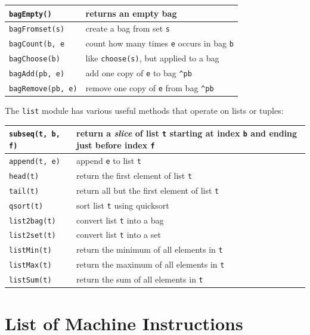 \documentclass{report}
\begin{document}
\vspace{1em}
\begin{tabular}{|l|l|}
\hline
\texttt{bagEmpty()} & returns an empty bag\\
\hline
\texttt{bagFromset(s)} & create a bag from set \texttt{s}\\
\hline
\texttt{bagCount(b, e} & count how many times \texttt{e} occurs in bag \texttt{b}\\
\hline
\texttt{bagChoose(b)} & like \texttt{choose(s)}, but applied to a bag\\
\hline
\texttt{bagAdd(pb, e)} & add one copy of \texttt{e} to bag \texttt{\^{}pb}\\
\hline
\texttt{bagRemove(pb, e)} & remove one copy of \texttt{e} from bag \texttt{\^{}pb}\\
\hline
\end{tabular}
\vspace{1em}

\noindent
{}
The \texttt{list} module has various useful methods that operate on lists
or tuples:

\vspace{1em}
\begin{tabular}{|l|l|}
\hline
\texttt{subseq(t, b, f)} & return a \emph{slice} of list \texttt{t} starting
at index \texttt{b} and ending just before index \texttt{f}\\
\hline
\texttt{append(t, e)} & append \texttt{e} to list \texttt{t}\\
\hline
\texttt{head(t)} & return the first element of list \texttt{t}\\
\hline
\texttt{tail(t)} & return all but the first element of list \texttt{t}\\
\hline
\texttt{qsort(t)} & sort list \texttt{t} using quicksort\\
\hline
\texttt{list2bag(t)} & convert list \texttt{t} into a bag \\
\hline
\texttt{list2set(t)} & convert list \texttt{t} into a set \\
\hline
\texttt{listMin(t)} & return the minimum of all elements in \texttt{t}\\
\hline
\texttt{listMax(t)} & return the maximum of all elements in \texttt{t}\\
\hline
\texttt{listSum(t)} & return the sum of all elements in \texttt{t}\\
\hline
\end{tabular}

\chapter{List of Machine Instructions}
\end{document}
